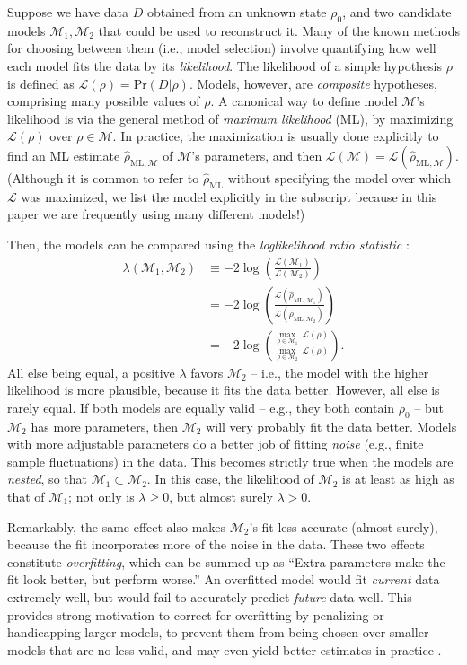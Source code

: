 \documentclass[aps,pra, twocolumn]{revtex4-1}
\newcommand{\M}{\mathcal{M}}
\newcommand{\cL}{\mathcal{L}}
\newcommand{\rhohat}{\hat{\rho}}
\newcommand{\rhoML}[1]{\rhohat_{\scriptscriptstyle{\mathrm{ML},#1}}}
\begin{document}
Suppose we have data $D$ obtained from an unknown state $\rho_{0}$, and two candidate models $\M_{1}, \M_{2}$ that could be used to reconstruct it.  Many of the known methods for choosing between them (i.e., model selection) involve quantifying how well each model fits the data by its \emph{likelihood}.  The likelihood of a simple hypothesis $\rho$ is defined as $\mathcal{L}(\rho) = \mathrm{Pr}(D|\rho)$.  Models, however, are \emph{composite} hypotheses, comprising many possible values of $\rho$.  A canonical way to define model $\M$'s likelihood is via the general method of \emph{maximum likelihood} (ML), by maximizing $\cL(\rho)$ over $\rho\in\M$.  In practice, the maximization is usually done explicitly to find an ML estimate $\hat{\rho}_{\mathrm{ML},\M}$ \cite{Hradil1997, JamesPRA2001, Blume-Kohout2010} of $\M$'s parameters, and then $\cL(\M) = \cL(\hat{\rho}_{\mathrm{ML},\M})$.  (Although it is common to refer to $\hat\rho_{\mathrm{ML}}$ without specifying the model over which $\cL$ was maximized, we list the model explicitly in the subscript because in this paper we are frequently using many different models!)

Then, the models can be compared using the \emph{loglikelihood ratio statistic} \cite{Neyman1933, Blume-Kohout2010, Moroder2013}:
\begin{align}
\lambda(\M_{1}, \M_{2}) &\equiv -2 \log \left(\frac{\cL(\M_{1})}{\cL(\M_{2})}\right)\\
&= -2 \log \left(\frac{\cL(\rhoML{\M_{1}})}{\cL(\rhoML{\M_{2}})}\right)\\
&= -2 \log \left(\frac{\underset{\rho \in \M_{1}}{\max}~\cL(\rho)}{\underset{\rho \in \M_{2}}{\max}~\cL(\rho)}\right).
\end{align}
All else being equal, a positive $\lambda$ favors $\M_2$ -- i.e., the model with the higher likelihood is more plausible, because it fits the data better.  However, all else is rarely equal.  If both models are equally valid -- e.g., they both contain $\rho_0$ -- but $\M_2$ has more parameters, then $\M_2$ will very probably fit the data better.  Models with more adjustable parameters do a better job of fitting \emph{noise} (e.g., finite sample fluctuations) in the data.  This becomes strictly true when the models are \emph{nested}, so that $\M_{1} \subset \M_{2}$.  In this case, the likelihood of $\M_{2}$ is at least as high as that of $\M_{1}$;  not only is $\lambda \geq 0$, but almost surely $\lambda > 0$.

Remarkably, the same effect also makes $\M_{2}$'s fit less accurate (almost surely), because the fit incorporates more of the noise in the data.  These two effects constitute \emph{overfitting}, which can be summed up as ``Extra parameters make the fit look better, but perform worse.''  An overfitted model would fit \emph{current} data extremely well,  but would fail to accurately predict \emph{future} data well. This provides strong motivation to correct for overfitting by penalizing or handicapping larger models, to prevent them from being chosen over smaller models that are no less valid, and may even yield better estimates in practice \cite{Akaike1974}.
\end{document}
